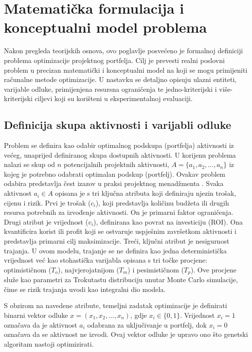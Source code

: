 \section{Matematička formulacija i konceptualni model problema}
\label{chap:model_problema}
Nakon pregleda teorijskih osnova, ovo poglavlje posvećeno je formalnoj definiciji problema optimizacije projektnog portfelja. Cilj je prevesti realni poslovni problem u precizan matematički i konceptualni model na koji se mogu primijeniti računalne metode optimizacije. U nastavku se detaljno opisuju ulazni entiteti, varijable odluke, primijenjena resursna ograničenja te jedno-kriterijski i više-kriterijski ciljevi koji su korišteni u eksperimentalnoj evaluaciji.
\subsection{Definicija skupa aktivnosti i varijabli odluke}
Problem se definira kao odabir optimalnog podskupa (portfelja) aktivnosti iz većeg, unaprijed definiranog skupa dostupnih aktivnosti. U korijenu problema nalazi se skup od $n$ potencijalnih projektnih aktivnosti, $A=\{a_1, a_2, ..., a_n\}$ iz kojeg je potrebno odabrati optimalan podskup (portfelj). Ovakav problem odabira predstavlja čest izazov u praksi projektnog menadžmenta \cite{PMI2021, Kerzner2017}.  Svaka aktivnost $a_i \in A$ opisana je s tri ključna atributa koji definiraju njezin trošak, cijenu i rizik.
Prvi je trošak ($c_i$), koji predstavlja količinu budžeta ili drugih resursa potrebnih za izvođenje aktivnosti. On je primarni faktor ograničenja. Drugi atribut je vrijednost ($v_i$), definirana kao povrat na investiciju (ROI).  Ona kvantificira korist ili profit koji se ostvaruje uspješnim završetkom aktivnosti i predstavlja primarni cilj maksimizacije. Treći, ključni atribut je nesigurnost trajanja. U ovom modelu, trajanje se ne definira kao jedna deterministička vrijednost već kao stohastička varijabla opisana s tri točke procjene: optimističnom ($T_o$), najvjerojatnijom ($T_m$) i pesimističnom ($T_p$). Ove procjene služe kao parametri za Trokutastu distribuciju unutar Monte Carlo simulacije, čime se rizik trajanja uvodi kao integralni dio modela.

S obzirom na navedene atribute, temeljni zadatak optimizacije je definirati binarni vektor odluke $x=(x_1, x_2, ..., x_n)$, gdje $x_i \in \{0,1\}$. Vrijednost $x_i=1$ označava da je aktivnost $a_i$ odabrana za uključivanje u portfelj, dok $x_i=0$ označava da se aktivnost ne izvodi. Ovaj vektor odluke je upravo ono što genetski algoritam nastoji optimizirati.


